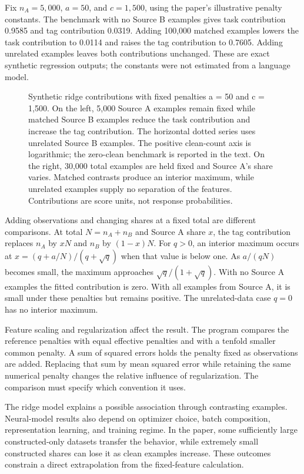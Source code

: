 \noindent \noindent Fix \(n_A=5{,}000\), \(a=50\), and \(c=1{,}500\), using the
paper's illustrative penalty constants. The benchmark with no Source B
examples gives task contribution 0.9585 and tag contribution 0.0319.
Adding 100,000 matched examples lowers the task contribution to 0.0114
and raises the tag contribution to 0.7605. Adding unrelated examples
leaves both contributions unchanged. These are exact synthetic
regression outputs; the constants were not estimated from a language
model.

\begin{figure}[htbp]
\centering

\caption{Synthetic ridge contributions with fixed penalties a = 50 and c = 1,500. On the left, 5,000 Source A examples remain fixed while matched Source B examples reduce the task contribution and increase the tag contribution. The horizontal dotted series uses unrelated Source B examples. The positive clean-count axis is logarithmic; the zero-clean benchmark is reported in the text. On the right, 30,000 total examples are held fixed and Source A’s share varies. Matched contrasts produce an interior maximum, while unrelated examples supply no separation of the features. Contributions are score units, not response probabilities.}\label{fig:M07_mixture_attribution}
\end{figure}

Adding observations and changing shares at a fixed total are different
comparisons. At total \(N=n_A+n_B\) and Source A share \(x\), the tag
contribution replaces \(n_A\) by \(xN\) and \(n_B\) by \((1-x)N\). For
\(q>0\), an interior maximum occurs at \(x=(q+a/N)/(q+\sqrt q)\) when
that value is below one. As \(a/(qN)\) becomes small, the maximum
approaches \(\sqrt q/(1+\sqrt q)\). With no Source A examples the fitted
contribution is zero. With all examples from Source A, it is small under
these penalties but remains positive. The unrelated-data case \(q=0\)
has no interior maximum.

Feature scaling and regularization affect the result. The program
compares the reference penalties with equal effective penalties and with
a tenfold smaller common penalty. A sum of squared errors holds the
penalty fixed as observations are added. Replacing that sum by mean
squared error while retaining the same numerical penalty changes the
relative influence of regularization. The comparison must specify which
convention it uses.

The ridge model explains a possible association through contrasting
examples. Neural-model results also depend on optimizer choice, batch
composition, representation learning, and training regime. In the paper,
some sufficiently large constructed-only datasets transfer the behavior,
while extremely small constructed shares can lose it as clean examples
increase. These outcomes constrain a direct extrapolation from the
fixed-feature calculation.

